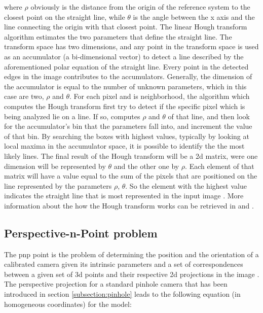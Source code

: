 where $\rho$ obviously is the distance from the origin of the reference system to the closest point on the straight line, while $\theta$ is the angle between the x axis and the line connecting the origin with that closest point.
The linear Hough transform algorithm estimates the two parameters that define the straight line. The transform space has two dimensions, and any point in the transform space is used as an accumulator (a bi-dimensional vector) to detect a line described by the aforementioned polar equation of the straight line. Every point in the detected edges in the image contributes to the accumulators. Generally, the dimension of the accumulator is equal to the number of unknown parameters, which in this case are two, $\rho$ and $\theta$. For each pixel and is neighborhood, the algorithm which computes the Hough transform first try to detect if the specific pixel which is being analyzed lie on a line. If so, computes $\rho$ and $\theta$ of that line, and then look for the accumulator's bin that the parameters fall into, and increment the value of that bin.
By searching the boxes with highest values, typically by looking at local maxima in the accumulator space, it is possible to identify the the most likely lines. The final result of the Hough transform will be a \acrshort{2d} matrix, were one dimension will be represented by $\theta$ and the other one by $\rho$.
Each element of that matrix will have a value equal to the sum of the pixels that are positioned on the line represented by the parameters $\rho$, $\theta$. So the element with the highest value indicates the straight line that is most represented in the input image \cite{houghreport}. More information about the how the Hough transform works can be retrieved in \cite{10.1145/361237.361242} and \cite{osti_4746348}.

\subsection{Perspective-n-Point problem}
The \acrfull{pnp} point is the problem of determining the position and the orientation of a calibrated camera given its intrinsic parameters and a set of correspondences between a given set of \acrshort{3d} points and their respective \acrshort{2d} projections in the image \cite{10.1007/s11263-008-0152-6}.
The perspective projection for a standard pinhole camera that has been introduced in section \ref{subsection:pinhole} leads to the following equation (in homogeneous coordinates) for the model:

